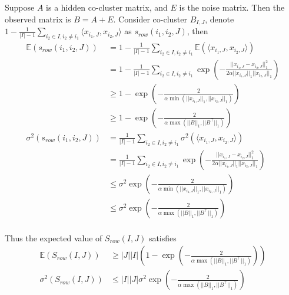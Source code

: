 Suppose $A$ is a hidden co-cluster matrix, and $E$ is the noise matrix. Then the observed matrix is $B = A + E$. Consider co-cluster $B_{I,J}$, denote $1 - \frac{1}{|I|-1} \sum_{i_2 \in I, i_2 \neq i_1} \langle x_{i_1,J}, x_{i_2,J}\rangle$ as $s_{row}(i_1, i_2, J)$, then
\begin{align*}
    \mathbb{E}(s_{row}(i_1, i_2, J)) & = 1 - \frac{1}{|I|-1} \sum_{i_2 \in I, i_2 \neq i_1} \mathbb{E}(\langle x_{i_1,J}, x_{i_2,J}\rangle)                                    \\
                                     & = 1 - \frac{1}{|I|-1} \sum_{i_2 \in I, i_2 \neq i_1} \exp(-\frac{||x_{i_1,J} - x_{i_2,J}||_1^2}{2\alpha||x_{i_1,J}||_1||x_{i_2,J}||_1}) \\
                                     & \ge 1 - \exp(-\frac{2}{\alpha \min(||x_{i_1,J}||_1, ||x_{i_2,J}||_1)})                                                                  \\
                                     & \ge 1 - \exp(-\frac{2}{\alpha \max(||B||_1, ||B^\top||_1)})                                                                             \\
    \sigma^2(s_{row}(i_1, i_2, J))   & = \frac{1}{|I|-1} \sum_{i_2 \in I, i_2 \neq i_1} \sigma^2(\langle x_{i_1,J}, x_{i_2,J}\rangle)                                          \\
                                     & = \frac{1}{|I|-1} \sum_{i_2 \in I, i_2 \neq i_1} \exp(-\frac{||x_{i_1,J} - x_{i_2,J}||_1^2}{2\alpha||x_{i_1,J}||_1||x_{i_2,J}||_1})     \\
                                     & \le \sigma^2 \exp(-\frac{2}{\alpha \min(||x_{i_1,J}||_1, ||x_{i_2,J}||_1)})                                                             \\
                                     & \le \sigma^2 \exp(-\frac{2}{\alpha \max(||B||_1, ||B^\top||_1)})                                                                        \\
\end{align*}

Thus the expected value of $S_{row}(I,J)$ satisfies
\begin{align*}
    \mathbb{E}(S_{row}(I,J)) & \ge |J||I| \left(1 - \exp(-\frac{2}{\alpha \max(||B||_1, ||B^\top||_1)}) \right) \\
    \sigma^2(S_{row}(I,J))   & \le |I||J| \sigma^2 \exp(-\frac{2}{\alpha \max(||B||_1, ||B^\top||_1)})          \\
\end{align*}

